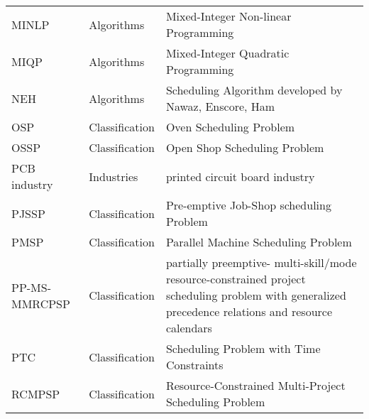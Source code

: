 {\begin{longtable}{llp{12cm}}
\index{MINLP (Mixed-Integer Non-linear Programming)}\index{Mixed-Integer Non-linear Programming (MINLP)}MINLP & Algorithms & Mixed-Integer Non-linear Programming\\
\index{MIQP (Mixed-Integer Quadratic Programming)}\index{Mixed-Integer Quadratic Programming (MIQP)}MIQP & Algorithms & Mixed-Integer Quadratic Programming\\
\index{NEH (Scheduling Algorithm developed by Nawaz, Enscore, Ham)}\index{Scheduling Algorithm developed by Nawaz, Enscore, Ham (NEH)}NEH & Algorithms & Scheduling Algorithm developed by Nawaz, Enscore, Ham\\
\index{OSP (Oven Scheduling Problem)}\index{Oven Scheduling Problem (OSP)}OSP & Classification & Oven Scheduling Problem\\
\index{OSSP (Open Shop Scheduling Problem)}\index{Open Shop Scheduling Problem (OSSP)}OSSP & Classification & Open Shop Scheduling Problem\\
\index{PCB industry (printed circuit board industry)}\index{printed circuit board industry (PCB industry)}PCB industry & Industries & printed circuit board industry\\
\index{PJSSP (Pre-emptive Job-Shop scheduling Problem)}\index{Pre-emptive Job-Shop scheduling Problem (PJSSP)}PJSSP & Classification & Pre-emptive Job-Shop scheduling Problem\\
\index{PMSP (Parallel Machine Scheduling Problem)}\index{Parallel Machine Scheduling Problem (PMSP)}PMSP & Classification & Parallel Machine Scheduling Problem\\
\index{PP-MS-MMRCPSP (partially preemptive- multi-skill/mode resource-constrained project scheduling problem with generalized precedence relations and resource calendars)}\index{partially preemptive- multi-skill/mode resource-constrained project scheduling problem with generalized precedence relations and resource calendars (PP-MS-MMRCPSP)}PP-MS-MMRCPSP & Classification & partially preemptive- multi-skill/mode resource-constrained project scheduling problem with generalized precedence relations and resource calendars\\
\index{PTC (Scheduling Problem with Time Constraints)}\index{Scheduling Problem with Time Constraints (PTC)}PTC & Classification & Scheduling Problem with Time Constraints\\
\index{RCMPSP (Resource-Constrained Multi-Project Scheduling Problem)}\index{Resource-Constrained Multi-Project Scheduling Problem (RCMPSP)}RCMPSP & Classification & Resource-Constrained Multi-Project Scheduling Problem\\

\end{longtable}}
